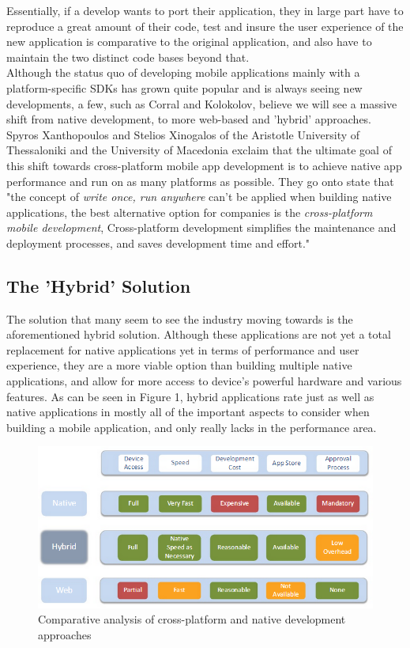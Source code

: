 \documentclass[11pt]{article}
\begin{document}
Essentially, if a develop wants to port their application, they in large part have to reproduce a great amount of their code, test and insure the user experience of the new application is comparative to the original application, and also have to maintain the two distinct code bases beyond that.\\

Although the status quo of developing mobile applications mainly with a platform-specific SDKs has grown quite popular and is always seeing new developments, a few, such as Corral and Kolokolov, believe we will see a massive shift from native development, to more web-based and 'hybrid' approaches.  Spyros Xanthopoulos and Stelios Xinogalos of the Aristotle University of Thessaloniki and the University of Macedonia exclaim that the ultimate goal of this shift towards cross-platform  mobile app development is to achieve native app performance and run on as many platforms as possible. They go onto state that "the concept of {\it write once, run anywhere} can't be applied when building native applications, the best alternative option for companies is the {\it cross-platform mobile development}, Cross-platform development simplifies the maintenance and deployment processes, and saves development time and effort."  ~\cite{Xanthopoulos2013}\\

\subsection{The 'Hybrid' Solution}
The solution that many seem to see the industry moving towards is the aforementioned hybrid solution.  Although these applications are not yet a total replacement for native applications yet in terms of performance and user experience, they are a more viable option than building multiple native applications, and allow for more access to device's powerful hardware and various features.  As can be seen in Figure 1, hybrid applications rate just as well as native applications in mostly all of the important aspects to consider when building a mobile application, and only really lacks in the performance area.\\


\begin{figure}[h]
\includegraphics[scale=0.7]{ComparativeTable}
\caption{Comparative analysis of cross-platform and native development approaches ~\cite{Kaminitz2011}}
\end{figure}
\end{document}
